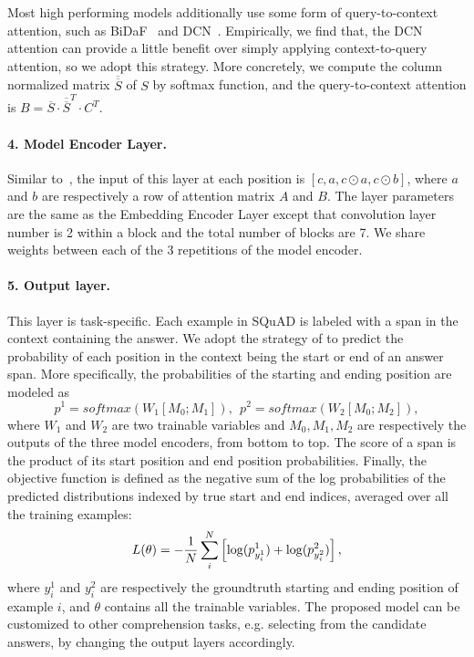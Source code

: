 \documentclass{article} \usepackage{iclr2018_conference,times}
\begin{document}
Most high performing models additionally use some form of query-to-context attention, such as BiDaF~\citep{SeoKFH16} and DCN~\citep{XiongZS16}.
Empirically, we find that, the DCN attention can provide a little benefit over simply applying context-to-query attention, so we adopt this strategy. More concretely, we compute the column normalized matrix $\overline{\overline {S}}$ of $S$ by softmax function, and the query-to-context attention is 
$B=\overline{S}\cdot {\overline{\overline {S}}}^T \cdot C^T$.

\paragraph{4. Model Encoder Layer.} Similar to~\cite{SeoKFH16}, the input of this layer at each position is $[c, a, c \odot a, c\odot b]$, where $a$ and $b$ are respectively a row of attention matrix $A$ and $B$. The layer parameters are the same as the Embedding Encoder Layer except that convolution layer number is 2 within a block and the total number of blocks are 7.  We share weights between each of the 3 repetitions of the model encoder.

\paragraph{5. Output layer.} This layer is task-specific. Each example in SQuAD is labeled with a span in the context containing the answer.  We adopt the strategy of \cite{SeoKFH16} to predict the probability of each position in the context being the start or end of an answer span. 
More specifically, the probabilities of the starting and ending position are modeled as
$$p^1 = softmax(W_1[M_0;M_1]), ~~ p^2 = softmax(W_2[M_0;M_2]),$$
where $W_1$ and $W_2$ are two trainable variables and $M_0, M_1, M_2$ are respectively the outputs of the three model encoders, from bottom to top.
The score of a span is the product of its start position and end position probabilities.
Finally, the objective function is defined as the negative sum of the log probabilities
of the predicted distributions indexed by true start and end indices, averaged over all the training examples:
$$L(\theta)=-{1\over N}\sum_i^N \left[\log(p^1_{y_i^1}) + \log(p^2_{y_i^2})\right],$$
where $y_i^1$ and $y_i^2$ are respectively the groundtruth starting and ending position of example $i$, and $\theta$ contains all the trainable variables.
The proposed model can be customized to other comprehension tasks, e.g. selecting from the candidate answers, by changing the output layers accordingly. 
\end{document}
